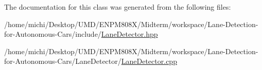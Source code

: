 The documentation for this class was generated from the following files\+:\begin{DoxyCompactItemize}
\item 
/home/michi/\+Desktop/\+U\+M\+D/\+E\+N\+P\+M808\+X/\+Midterm/workspace/\+Lane-\/\+Detection-\/for-\/\+Autonomous-\/\+Cars/include/\hyperlink{LaneDetector_8hpp}{Lane\+Detector.\+hpp}\item 
/home/michi/\+Desktop/\+U\+M\+D/\+E\+N\+P\+M808\+X/\+Midterm/workspace/\+Lane-\/\+Detection-\/for-\/\+Autonomous-\/\+Cars/\+Lane\+Detector/\hyperlink{LaneDetector_8cpp}{Lane\+Detector.\+cpp}\end{DoxyCompactItemize}
